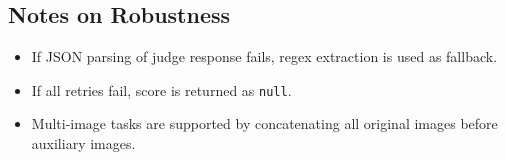\documentclass{article}
\theoremstyle{plain}
\theoremstyle{definition}
\theoremstyle{remark}
\begin{document}
\subsection{Notes on Robustness}
\begin{itemize}
\item If JSON parsing of judge response fails, regex extraction is used as fallback.
\item If all retries fail, score is returned as \texttt{null}.
\item Multi-image tasks are supported by concatenating all original images before auxiliary images.
\end{itemize}
\end{document}
